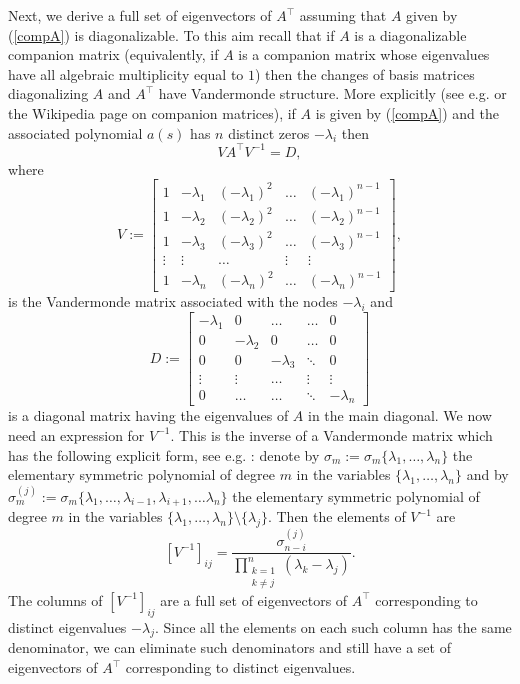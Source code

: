 \documentclass[12pt]{article}
\newcommand{\tp}{^{\top}}
\def\bmat{\left[ \begin{array}}
\def\emat{\end{array} \right]}
\begin{document}
Next, we derive a full set of eigenvectors of $A\tp$ assuming that $A$ given by (\ref{compA}) is diagonalizable. To this aim recall that if $A$ is a diagonalizable companion matrix (equivalently, if  $A$ is a  companion matrix whose eigenvalues have all algebraic multiplicity equal to $1$) then the changes of basis matrices diagonalizing $A$ and $A\tp$ 
have Vandermonde structure.
More explicitly (see e.g.\cite{turnbull1961introduction} or the Wikipedia page on companion matrices), if $A$ is given by (\ref{compA}) and the associated polynomial $a(s)$ has $n$ distinct zeros $-\lambda_i$  
then
$$
VA\tp V^{-1} = D,
$$
where 
$$
V:=\bmat{cccccc}
1&-\lambda_1 &(-\lambda_1)^2 &\dots &(-\lambda_1)^{n-1}\\
1&-\lambda_2 &(-\lambda_2)^2 &\dots &(-\lambda_2)^{n-1}\\
1&-\lambda_3 &(-\lambda_3)^2 &\dots &(-\lambda_3)^{n-1}\\
\vdots&\vdots&\dots&\vdots&\vdots\\
1&-\lambda_n &(-\lambda_n)^2 &\dots &(-\lambda_n)^{n-1}
\emat, $$
is the Vandermonde matrix associated with the nodes $-\lambda_i$ and
$$D:= \bmat{cccccc}
-\lambda_1 &0 &\dots&\dots &0\\
0&-\lambda_2 &0 &\dots &0\\
0&0&-\lambda_3 &\ddots &0\\
\vdots&\vdots&\dots&\vdots&\vdots\\
0&\dots & \dots&\ddots &-\lambda_n
\emat
$$
is a diagonal matrix having the eigenvalues of $A$ in the main diagonal.
We now need an expression for $V^{-1}$. This is the inverse of a Vandermonde matrix 
which has the following explicit form, see e.g. \cite{EISINBERG20061384}:
denote by $\sigma_{m}:=\sigma_{m}\{\lambda_1, \dots, \lambda_n\}$
the  elementary symmetric polynomial of degree $m$
in the variables $\{\lambda_1, \dots, \lambda_n\}$ and by
$\sigma_{m}^{(j)}:=\sigma_{m}\{\lambda_1, \dots,\lambda_{i-1},\lambda_{i+1},\dots \lambda_n\}$
the  elementary symmetric polynomial of degree $m$
in the variables $\{\lambda_1, \dots, \lambda_n\} \setminus \{\lambda_j\}$. Then the elements of $V^{-1}$ are
\begin{equation}\label{eigvinv}
[V^{-1}]_{ij} = \frac{\sigma_{n-i}^{(j)}}{\prod_{\substack{k=1 \\ k \neq j}}^n (\lambda_k - \lambda_j)}.
\end{equation}
The columns of $[V^{-1}]_{ij}$ are a full set of eigenvectors of $A\tp$ corresponding to distinct eigenvalues
$-\lambda_j$. Since all the elements on each such column has the same denominator, we can eliminate such denominators and still have a set of eigenvectors of $A\tp$ corresponding to distinct eigenvalues.
\end{document}

